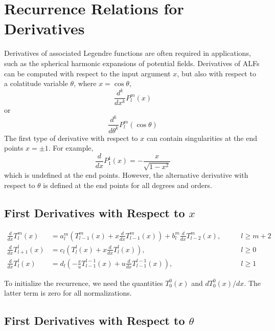\documentclass[12pt]{article}
\begin{document}
\section{Recurrence Relations for Derivatives}

Derivatives of associated Legendre functions are often required in
applications, such as the spherical harmonic expansions of potential fields.
Derivatives of ALFs can be computed with respect to the input argument
$x$, but also with respect to a colatitude variable $\theta$, where
$x = \cos{\theta}$,
\begin{equation}
\frac{d^k}{dx^k} P_l^m(x)
\end{equation}
or
\begin{equation}
\frac{d^k}{d\theta^k} P_l^m(\cos{\theta})
\end{equation}
The first type of derivative with respect to $x$ can contain singularities
at the end points $x = \pm 1$. For example,
\begin{equation}
\frac{d}{dx} P_1^1(x) = -\frac{x}{\sqrt{1-x^2}}
\end{equation}
which is undefined at the end points. However, the alternative derivative with
respect to $\theta$ is defined at the end points for all degrees and orders.

\subsection{First Derivatives with Respect to $x$}

\begin{subequations}
\begin{alignat}{3}
\frac{d}{dx} T_l^m(x) &= a_l^m \left( T_{l-1}^m(x) + x \frac{d}{dx} T_{l-1}^m(x) \right) + b_l^m \frac{d}{dx} T_{l-2}^m(x), & \qquad l \geq m + 2 \\
\frac{d}{dx} T_{l+1}^l(x) &= c_l \left( T_l^l(x) + x \frac{d}{dx} T_l^l(x) \right), & \qquad l \geq 0 \\
\frac{d}{dx} T_l^l(x) &= d_l \left( -\frac{x}{u} T_{l-1}^{l-1}(x) + u \frac{d}{dx} T_{l-1}^{l-1}(x) \right), & \qquad l \geq 1
\end{alignat}
\end{subequations}

To initialize the recurrence, we need the quantities $T_0^0(x)$ and $d T_0^0(x) / dx$. The latter
term is zero for all normalizations.

\subsection{First Derivatives with Respect to $\theta$}
\end{document}
